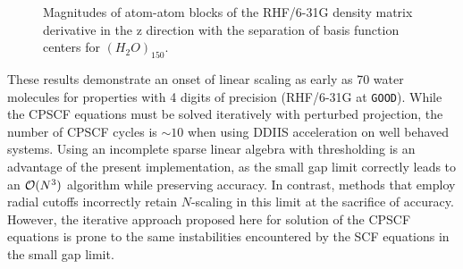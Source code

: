 \documentclass[prl,aps,preprint,showpacs,superbib]{revtex4}
\begin{document}
{\begin{figure}
  \caption{\protect
    Magnitudes of atom-atom blocks of the RHF/6-31G density matrix derivative
    in the z direction with the separation of basis function centers for $(H_2O)_{150}$.
  }\label{fig:DPrimeZ_150_6-31G}
\end{figure}
}

These results demonstrate an onset of linear scaling as early as 70 water molecules
for properties with 4 digits of precision (RHF/6-31G at {\tt GOOD}). 
While the CPSCF equations must be solved iteratively with perturbed projection,  
the number of CPSCF cycles is $\sim 10$ when using DDIIS acceleration on well behaved systems.
Using an incomplete sparse linear algebra with thresholding is an advantage of the 
present implementation, as the small gap limit correctly leads to an ${\cal O}(N^3)$ 
algorithm while preserving accuracy.  In contrast, methods that employ radial cutoffs
incorrectly retain $N$-scaling in this limit at the sacrifice of accuracy. 
However, the iterative approach proposed here for solution of the CPSCF equations is prone to the same 
instabilities encountered by the SCF equations in the small gap limit.  
\end{document}
